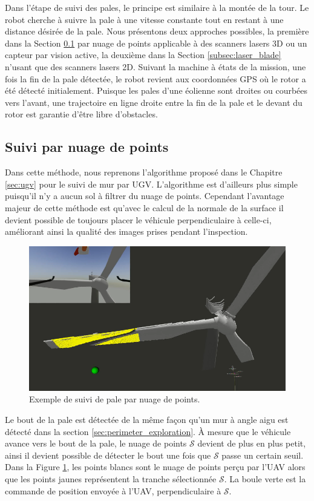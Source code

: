 Dans l'étape de suivi des pales, le principe est similaire à la montée de la tour. Le robot cherche à suivre la pale à une vitesse constante tout en restant à une distance désirée de la pale. Nous présentons deux approches possibles, la première dans la Section \ref{subsec:pcl_blade} par nuage de points applicable à des scanners lasers 3D ou un capteur par vision active, la deuxième dans la Section \ref{subsec:laser_blade} n'usant que des scanners lasers 2D.
Suivant la machine à états de la mission, une fois la fin de la pale détectée, le robot revient aux coordonnées GPS où le rotor a été détecté initialement. Puisque les pales d'une éolienne sont droites ou courbées vers l'avant, une trajectoire en ligne droite entre la fin de la pale et le devant du rotor est garantie d'être libre d'obstacles.

\subsection{Suivi par nuage de points}
\label{subsec:pcl_blade}

Dans cette méthode, nous reprenons l'algorithme proposé dans le Chapitre \ref{sec:ugv} pour le suivi de mur par UGV. L'algorithme est d'ailleurs plus simple puisqu'il n'y a aucun sol à filtrer du nuage de points. Cependant l'avantage majeur de cette méthode est qu’avec le calcul de la normale de la surface il devient possible de toujours placer le véhicule perpendiculaire à celle-ci, améliorant ainsi la qualité des images prises pendant l'inspection.

\begin{figure}[htp]
  \centering
  \includegraphics[width=0.7\linewidth]{images/suivit_nuage_points.png}
  \caption{Exemple de suivi de pale par nuage de points.}
  \label{fig:pcl_blade_follow}
\end{figure}

Le bout de la pale est détectée de la même façon qu'un mur à angle aigu est détecté dans la section \ref{sec:perimeter_exploration}. À mesure que le véhicule avance vers le bout de la pale, le nuage de points $\mathcal{S}$ devient de plus en plus petit, ainsi il devient possible de détecter le bout une fois que $\mathcal{S}$ passe un certain seuil. Dans la Figure \ref{fig:pcl_blade_follow}, les points blancs sont le nuage de points perçu par l'UAV alors que les points jaunes représentent la tranche sélectionnée $\mathcal{S}$. La boule verte est la commande de position envoyée à l'UAV, perpendiculaire à $\mathcal{S}$.

